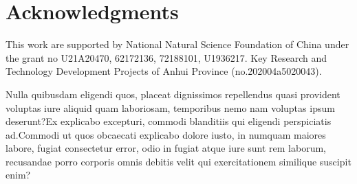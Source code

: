 \documentclass[letterpaper]{article} %
\begin{document}
\section{Acknowledgments}
This work are supported by National Natural Science Foundation of China under the grant no U21A20470, 62172136, 72188101, U1936217. Key Research and Technology Development Projects of Anhui Province (no.202004a5020043).












Nulla quibusdam eligendi quos, placeat dignissimos repellendus quasi provident voluptas iure aliquid quam laboriosam, temporibus nemo nam voluptas ipsum deserunt?Ex explicabo excepturi, commodi blanditiis qui eligendi perspiciatis ad.Commodi ut quos obcaecati explicabo dolore iusto, in numquam maiores labore, fugiat consectetur error, odio in fugiat atque iure sunt rem laborum, recusandae porro corporis omnis debitis velit qui exercitationem similique suscipit enim?\clearpage

\end{document}
